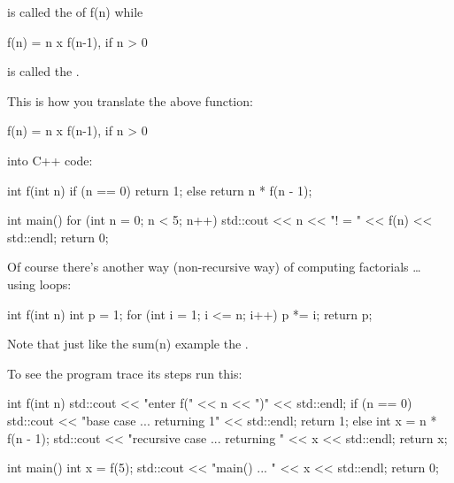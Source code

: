 
is called the  of f(n) while

f(n) = n x f(n-1), if n > 0

is called the .

This is how you translate the above function:

f(n) = n x f(n-1), if n > 0


into C++ code:

\begin{consolethree}[escapeinside=||]
int f(int n)
{
    if (n == 0)
        return 1;
    else
        return n * f(n - 1);
}

int main()
{
    for (int n = 0; n < 5; n++)
    {
        std::cout << n << "! = " << f(n)
                  << std::endl;
    }
    return 0;
}
\end{consolethree}

Of course there's another way (non-recursive way) of
computing factorials \ldots{} using loops:

\begin{consolethree}[escapeinside=||]
int f(int n)
{
    int p = 1;
    for (int i = 1; i <= n; i++)
    {
        p *= i;
    }
    return p;
}
\end{consolethree}

Note that just like the sum(n) example the .

To see the program trace its steps run this:

\begin{consolethree}[escapeinside=||]
int f(int n)
{
    std::cout << "enter f(" << n << ")" << std::endl;
    if (n == 0)
    {
        std::cout << "base case ... returning 1"
                  << std::endl;
        return 1;
    }
    else
    {
        int x = n * f(n - 1);
        std::cout << "recursive case ... returning "
                  << x << std::endl;
        return x;
    }
}

int main()
{
    int x = f(5);
    std::cout << "main() ... " << x << std::endl;
    return 0;
}
\end{consolethree}

